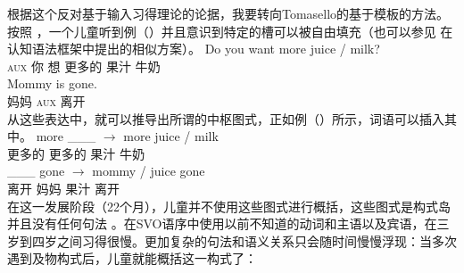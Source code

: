 根据这个反对基于输入习得理论的论据，我要转向Tomasello的基于模板的方法\indexcxgstartc。按照 \citet[Section~4.2.1]{Tomasello2003a}，一个儿童听到例（）并且意识到特定的槽可以被自由填充（也可以参见 在认知语法框架中提出的相似方案）。
\eal
\ex 
\gll Do you want more juice / milk?\\
     \textsc{aux} 你 想 更多的 果汁 {} 牛奶\\
\ex 
\gll Mommy is gone.\\
    妈妈 \textsc{aux} 离开\\
\zl
从这些表达中，就可以推导出所谓的中枢图式，正如例（）所示，词语可以插入其中。
\eal
\ex 
\gll  more \_\_\_ $\to$ more juice / milk\\
     更多的 {} {} 更多的 果汁 {} 牛奶\\
\ex 
\gll  \_\_\_ gone $\to$ mommy / juice gone\\
     {} 离开 {} 妈妈 {} 果汁 离开\\
\zl
在这一发展阶段（22个月），儿童并不使用这些图式进行概括，这些图式是构式岛并且没有任何句法 \citep{TADR97a}。在SVO语序中使用以前不知道的动词和主语以及宾语，在三岁到四岁之间习得很慢\citep[--129]{Tomasello2003a}。更加复杂的句法和语义关系只会随时间慢慢浮现：当多次遇到及物构式后，儿童就能概括这一构式了：
